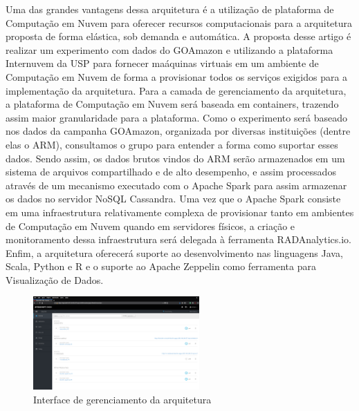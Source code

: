 \documentclass[conference]{IEEEtran}
\begin{document}
Uma das grandes vantagens dessa arquitetura \'{e} a utiliza\c{c}\~{a}o de plataforma de Computa\c{c}\~{a}o em Nuvem para oferecer recursos computacionais para a arquitetura proposta de forma el\'{a}stica, sob demanda e autom\'{a}tica. A proposta desse artigo \'{e} realizar um experimento com dados do GOAmazon e utilizando a plataforma Internuvem da USP para fornecer ma\'{a}quinas virtuais em um ambiente de Computa\c{c}\~{a}o em Nuvem de forma a provisionar todos os servi\c{c}os exigidos para a implementa\c{c}\~{a}o da arquitetura. Para a camada de gerenciamento da arquitetura, a plataforma de Computa\c{c}\~{a}o em Nuvem ser\'{a} baseada em containers, trazendo assim maior granularidade para a plataforma. Como o experimento ser\'{a} baseado nos dados da campanha GOAmazon, organizada por diversas institui\c{c}\~{o}es (dentre elas o ARM\cite{ArmProject}), consultamos o grupo para entender a forma como suportar esses dados. Sendo assim, os dados brutos vindos do ARM ser\~{a}o armazenados em um sistema de arquivos compartilhado e de alto desempenho, e assim processados atrav\'{e}s de um mecanismo executado com o Apache Spark\cite{ApacheSpark} para assim armazenar os dados no servidor NoSQL Cassandra\cite{ApacheCassandra}. Uma vez que o Apache Spark consiste em uma infraestrutura relativamente complexa de provisionar tanto em ambientes de Computa\c{c}\~{a}o em Nuvem quando em servidores f\'{i}sicos, a cria\c{c}\~{a}o e monitoramento dessa infraestrutura ser\'{a} delegada \`{a} ferramenta RADAnalytics.io\cite{RadanalyticsIo}. Enfim, a arquitetura oferecer\'{a} suporte ao desenvolvimento nas linguagens Java, Scala, Python e R e o suporte ao Apache Zeppelin\cite{ApacheZeppelin} como ferramenta para Visualiza\c{c}\~{a}o de Dados.

\begin{figure}[!tp]
	\centering
	\includegraphics[width=2.5in]{bioclim.png}
	\caption{Interface de gerenciamento da arquitetura}
	\label{bioclim}
\end{figure}
\end{document}
